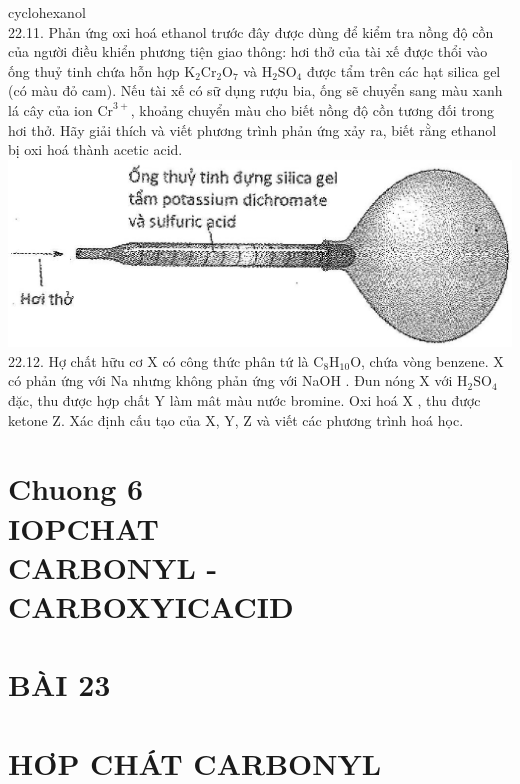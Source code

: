 \documentclass[10pt]{article}
\begin{document}
cyclohexanol\\
22.11. Phản ứng oxi hoá ethanol trước đây được dùng để kiểm tra nồng độ cồn của người điều khiển phương tiện giao thông: hơi thở của tài xế được thổi vào ống thuỷ tinh chứa hỗn hợp $\mathrm{K}_{2} \mathrm{Cr}_{2} \mathrm{O}_{7}$ và $\mathrm{H}_{2} \mathrm{SO}_{4}$ được tẩm trên các hạt silica gel (có màu đỏ cam). Nếu tài xế có sữ dụng rượu bia, ống sẽ chuyển sang màu xanh lá cây của ion $\mathrm{Cr}^{3+}$, khoảng chuyển màu cho biết nồng độ cồn tương đối trong hơi thở. Hãy giải thích và viết phương trình phản ứng xảy ra, biết rằng ethanol bị oxi hoá thành acetic acid.\\
\includegraphics[max width=\textwidth, center]{2025_10_23_fa9073eecee116ad8cf2g-76}\\
22.12. Hợ chất hữu cơ X có công thức phân tứ là $\mathrm{C}_{8} \mathrm{H}_{10} \mathrm{O}$, chứa vòng benzene. X có phản ứng với Na nhưng không phản ứng với NaOH . Đun nóng X với $\mathrm{H}_{2} \mathrm{SO}_{4}$ đặc, thu được hợp chất Y làm mât màu nước bromine. Oxi hoá X , thu được ketone Z. Xác định cấu tạo của X, Y, Z và viết các phương trình hoá học.

\section*{Chuong 6 \\
 IOPCHAT \\
 CARBONYL - CARBOXYICACID }
\section*{BÀI 23}
\section*{HƠP CHÁT CARBONYL}
\end{document}
